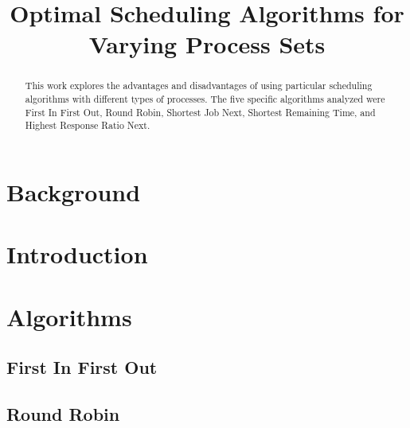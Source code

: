 \documentclass[conference,11pt]{IEEEtran}
\begin{document}
%
\title{Optimal Scheduling Algorithms for Varying Process Sets}

\author{
}

\maketitle

\begin{abstract}
This work explores the advantages and disadvantages of using particular scheduling algorithms with different types of processes. The five specific algorithms analyzed were First In First Out, Round Robin, Shortest Job Next, Shortest Remaining Time, and Highest Response Ratio Next.
\end{abstract}

\section{Background}


\section{Introduction}


\section{Algorithms}


\subsection{First In First Out}


\subsection{Round Robin}
\end{document}
